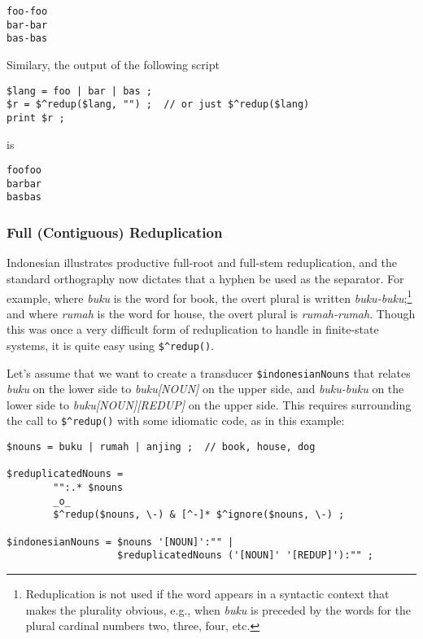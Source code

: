 \begin{Verbatim}
foo-foo
bar-bar
bas-bas
\end{Verbatim}

Similary, the output of the following script

\begin{Verbatim}
$lang = foo | bar | bas ;
$r = $^redup($lang, "") ;  // or just $^redup($lang)
print $r ;
\end{Verbatim}

\noindent
is

\begin{Verbatim}
foofoo
barbar
basbas
\end{Verbatim}


\subsubsection{Full (Contiguous) Reduplication}

Indonesian illustrates productive full-root and full-stem reduplication, and the standard
orthography now dictates that a hyphen be used as the separator.  For example, where \emph{buku} is the
word for book, the overt plural is written \emph{buku-buku};\footnote{Reduplication is not used if
the word appears in a syntactic context that makes the plurality
obvious, e.g., when \emph{buku} is preceded by
the words for the plural cardinal numbers two, three, four, etc.} and where \emph{rumah} is the word for house,
the overt plural is \emph{rumah-rumah}.  Though this was once a very difficult
form of reduplication to handle in finite-state systems, it is quite easy using \verb!$^redup()!.


Let's assume that we want to create a transducer \verb!$indonesianNouns!
that relates \emph{buku} on the lower
side to \emph{buku[NOUN]} on the upper side, and \emph{buku-buku} on the
lower side to \emph{buku[NOUN][REDUP]} on
the upper side.  This requires surrounding the call to \verb!$^redup()!
with some idiomatic code, as in this example:

\begin{Verbatim}
$nouns = buku | rumah | anjing ;  // book, house, dog

$reduplicatedNouns = 
        "":.* $nouns 
        _o_
        $^redup($nouns, \-) & [^-]* $^ignore($nouns, \-) ;

$indonesianNouns = $nouns '[NOUN]':"" |
                   $reduplicatedNouns ('[NOUN]' '[REDUP]'):"" ;
\end{Verbatim}

